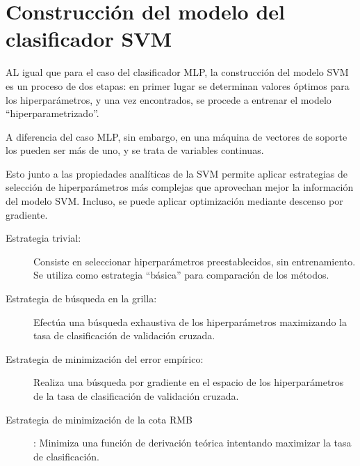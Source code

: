 %
%
\section{Construcción del modelo del clasificador SVM}
%
AL igual que para el caso del clasificador MLP, la construcción
del modelo SVM es un proceso de dos etapas: en primer lugar se determinan
valores óptimos para los hiperparámetros, y una vez encontrados, se procede a
entrenar el modelo ``hiperparametrizado''.

A diferencia del caso MLP, sin embargo, en una máquina de vectores de soporte
los  pueden ser más de uno, y se trata de variables continuas.

Esto junto a las propiedades analíticas de la SVM permite aplicar estrategias
de selección de hiperparámetros más complejas que aprovechan mejor la información
del modelo SVM. Incluso, se puede aplicar optimización mediante descenso por gradiente.
%
\begin{description}
\item[Estrategia trivial:] Consiste en seleccionar hiperparámetros
  preestablecidos, sin entrenamiento. Se utiliza como estrategia
  ``básica'' para comparación de los métodos.
\item[Estrategia de búsqueda en la grilla:] Efectúa una búsqueda
  exhaustiva de los hiperparámetros maximizando la tasa de
  clasificación de validación cruzada.
\item[Estrategia de minimización del error empírico:] Realiza una
  búsqueda por gradiente en el espacio de los hiperparámetros de la
  tasa de clasificación de validación cruzada.
\item[Estrategia de minimización de la cota RMB]: Minimiza una función de derivación teórica
  intentando maximizar la tasa de clasificación.
\end{description}
%
